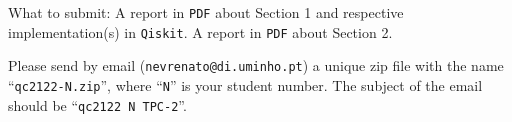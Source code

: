 \documentclass[a4paper, 11pt]{article}
\theoremstyle{definition}
\begin{document}
\label{sec:ess}
\begin{mdframed}
  What to submit: A report in \texttt{PDF} about Section 1 and 
  respective implementation(s) in \texttt{Qiskit}. A report in
  \texttt{PDF} about Section 2.

  Please send by email (\texttt{nevrenato@di.uminho.pt}) a unique zip
  file with the name ``\texttt{qc2122-N.zip}'', where ``\texttt{N}''
  is your student number.  The subject of the email should be
  ``\texttt{qc2122 N TPC-2}''.
\end{mdframed}






\end{document}
